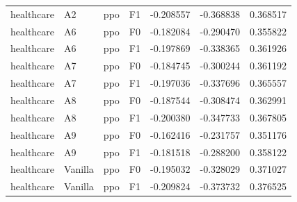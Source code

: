 \begin{tabular}{llllrrr}
healthcare &      A2 &       ppo &  F1 & -0.208557 & -0.368838 &  0.368517 \\
healthcare &      A6 &       ppo &  F0 & -0.182084 & -0.290470 &  0.355822 \\
healthcare &      A6 &       ppo &  F1 & -0.197869 & -0.338365 &  0.361926 \\
healthcare &      A7 &       ppo &  F0 & -0.184745 & -0.300244 &  0.361192 \\
healthcare &      A7 &       ppo &  F1 & -0.197036 & -0.337696 &  0.365557 \\
healthcare &      A8 &       ppo &  F0 & -0.187544 & -0.308474 &  0.362991 \\
healthcare &      A8 &       ppo &  F1 & -0.200380 & -0.347733 &  0.367805 \\
healthcare &      A9 &       ppo &  F0 & -0.162416 & -0.231757 &  0.351176 \\
healthcare &      A9 &       ppo &  F1 & -0.181518 & -0.288200 &  0.358122 \\
healthcare & Vanilla &       ppo &  F0 & -0.195032 & -0.328029 &  0.371027 \\
healthcare & Vanilla &       ppo &  F1 & -0.209824 & -0.373732 &  0.376525 \\
\bottomrule
\end{tabular}
